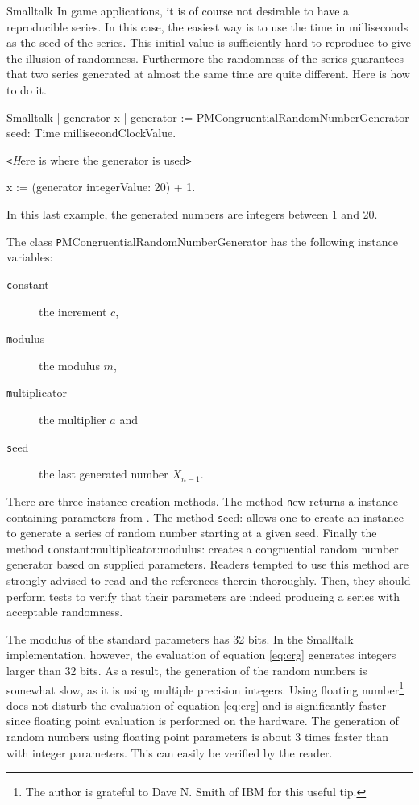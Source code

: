 \begin{displaycode}{Smalltalk}
In game applications, it is of course not desirable to have a
reproducible series. In this case, the easiest way is to use the
time in milliseconds as the seed of the series. This initial value
is sufficiently hard to reproduce to give the illusion of
randomness. Furthermore the randomness of the series guarantees
that two series generated at almost the same time are quite
different. Here is how to do it.
\begin{displaycode}{Smalltalk}
 | generator x |
 generator := PMCongruentialRandomNumberGenerator
                        seed: Time millisecondClockValue.

\hfil{\texttt <\textsl Here is where the generator is used\texttt
>}\hfil

 x := (generator integerValue: 20) + 1.
\end{displaycode}

In this last example, the generated numbers are integers between 1
and 20.

 The class {\texttt
PMCongruentialRandomNumberGenerator} has the following instance
variables:
\begin{description}
  \item[\texttt constant] the increment $c$,
  \item[\texttt modulus] the modulus $m$,
  \item[\texttt multiplicator] the multiplier $a$ and
  \item[\texttt seed] the last generated number $X_{n-1}$.
\end{description}
There are three instance creation methods. The method {\texttt new}
returns a  instance containing parameters from
\cite{Knuth2}. The method {\texttt seed:} allows one to create an
instance to generate a series of random number starting at a given
seed. Finally the method {\texttt constant:multiplicator:modulus:}
creates a congruential random number generator based on supplied
parameters. Readers tempted to use this method are strongly
advised to read \cite{Knuth2} and the references therein
thoroughly. Then, they should perform tests to verify that their
parameters are indeed producing a series with acceptable
randomness.

The modulus of the standard parameters has 32 bits. In the
Smalltalk implementation, however, the evaluation of equation
\ref{eq:crg} generates integers larger than 32 bits. As a result,
the generation of the random numbers is somewhat slow, as it is
using multiple precision integers. Using floating
number\footnote{The author is grateful to Dave N. Smith of IBM for
this useful tip.} does not disturb the evaluation of equation
\ref{eq:crg} and is significantly faster since floating point
evaluation is performed on the hardware. The generation of random
numbers using floating point parameters is about 3 times faster
than with integer parameters. This can easily be verified by the
reader.


\end{displaycode}
